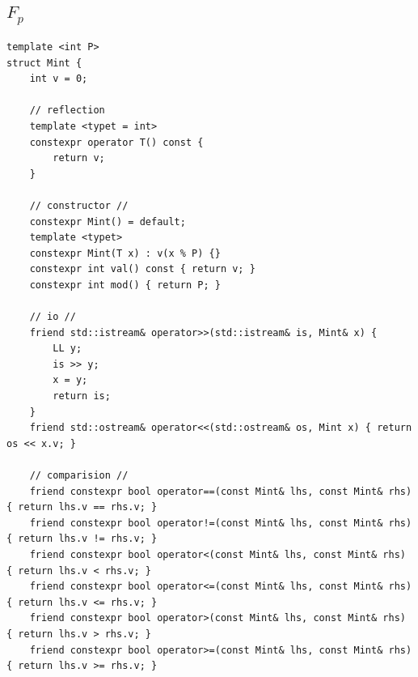 \documentclass[UTF8, a4paper, titlepage, twoside]{ctexart}
\begin{document}
\newpage

\subsection { \(F_p\) }
\begin{lstlisting}[style=cpp]
template <int P>
struct Mint {
    int v = 0;

    // reflection
    template <typet = int>
    constexpr operator T() const {
        return v;
    }

    // constructor //
    constexpr Mint() = default;
    template <typet>
    constexpr Mint(T x) : v(x % P) {}
    constexpr int val() const { return v; }
    constexpr int mod() { return P; }

    // io //
    friend std::istream& operator>>(std::istream& is, Mint& x) {
        LL y;
        is >> y;
        x = y;
        return is;
    }
    friend std::ostream& operator<<(std::ostream& os, Mint x) { return os << x.v; }

    // comparision //
    friend constexpr bool operator==(const Mint& lhs, const Mint& rhs) { return lhs.v == rhs.v; }
    friend constexpr bool operator!=(const Mint& lhs, const Mint& rhs) { return lhs.v != rhs.v; }
    friend constexpr bool operator<(const Mint& lhs, const Mint& rhs) { return lhs.v < rhs.v; }
    friend constexpr bool operator<=(const Mint& lhs, const Mint& rhs) { return lhs.v <= rhs.v; }
    friend constexpr bool operator>(const Mint& lhs, const Mint& rhs) { return lhs.v > rhs.v; }
    friend constexpr bool operator>=(const Mint& lhs, const Mint& rhs) { return lhs.v >= rhs.v; }


\end{lstlisting}
\end{document}
